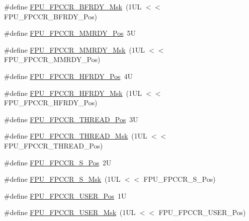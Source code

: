 \begin{DoxyCompactItemize}
\item 
\#define \mbox{\hyperlink{group___c_m_s_i_s___f_p_u_gad349eb1323d8399d54a04c0bfd520cb2}{F\+P\+U\+\_\+\+F\+P\+C\+C\+R\+\_\+\+B\+F\+R\+D\+Y\+\_\+\+Msk}}~(1\+U\+L $<$$<$ F\+P\+U\+\_\+\+F\+P\+C\+C\+R\+\_\+\+B\+F\+R\+D\+Y\+\_\+\+Pos)
\item 
\#define \mbox{\hyperlink{group___c_m_s_i_s___f_p_u_gaccdb481211629f9440431439231187f1}{F\+P\+U\+\_\+\+F\+P\+C\+C\+R\+\_\+\+M\+M\+R\+D\+Y\+\_\+\+Pos}}~5U
\item 
\#define \mbox{\hyperlink{group___c_m_s_i_s___f_p_u_gadedfaec9fdd07261573e823a4dcfb5c4}{F\+P\+U\+\_\+\+F\+P\+C\+C\+R\+\_\+\+M\+M\+R\+D\+Y\+\_\+\+Msk}}~(1\+U\+L $<$$<$ F\+P\+U\+\_\+\+F\+P\+C\+C\+R\+\_\+\+M\+M\+R\+D\+Y\+\_\+\+Pos)
\item 
\#define \mbox{\hyperlink{group___c_m_s_i_s___f_p_u_gab12733991487acc2da41ca300fe36fb6}{F\+P\+U\+\_\+\+F\+P\+C\+C\+R\+\_\+\+H\+F\+R\+D\+Y\+\_\+\+Pos}}~4U
\item 
\#define \mbox{\hyperlink{group___c_m_s_i_s___f_p_u_gaf4beaa279abff34828344bd594fff8a1}{F\+P\+U\+\_\+\+F\+P\+C\+C\+R\+\_\+\+H\+F\+R\+D\+Y\+\_\+\+Msk}}~(1\+U\+L $<$$<$ F\+P\+U\+\_\+\+F\+P\+C\+C\+R\+\_\+\+H\+F\+R\+D\+Y\+\_\+\+Pos)
\item 
\#define \mbox{\hyperlink{group___c_m_s_i_s___f_p_u_ga0937d64c42374200af44b22e5b49fd26}{F\+P\+U\+\_\+\+F\+P\+C\+C\+R\+\_\+\+T\+H\+R\+E\+A\+D\+\_\+\+Pos}}~3U
\item 
\#define \mbox{\hyperlink{group___c_m_s_i_s___f_p_u_ga8d18cd88336d63d4b1810383aa8da700}{F\+P\+U\+\_\+\+F\+P\+C\+C\+R\+\_\+\+T\+H\+R\+E\+A\+D\+\_\+\+Msk}}~(1\+U\+L $<$$<$ F\+P\+U\+\_\+\+F\+P\+C\+C\+R\+\_\+\+T\+H\+R\+E\+A\+D\+\_\+\+Pos)
\item 
\#define \mbox{\hyperlink{group___c_m_s_i_s___f_p_u_ga4123d3881e5342251f559cec19e23b4e}{F\+P\+U\+\_\+\+F\+P\+C\+C\+R\+\_\+\+S\+\_\+\+Pos}}~2U
\item 
\#define \mbox{\hyperlink{group___c_m_s_i_s___f_p_u_ga47d3d3b29514c7d7581cfcc304368cea}{F\+P\+U\+\_\+\+F\+P\+C\+C\+R\+\_\+\+S\+\_\+\+Msk}}~(1\+U\+L $<$$<$ F\+P\+U\+\_\+\+F\+P\+C\+C\+R\+\_\+\+S\+\_\+\+Pos)
\item 
\#define \mbox{\hyperlink{group___c_m_s_i_s___f_p_u_gaea663104375ce6be15470e3db294c92d}{F\+P\+U\+\_\+\+F\+P\+C\+C\+R\+\_\+\+U\+S\+E\+R\+\_\+\+Pos}}~1U
\item 
\#define \mbox{\hyperlink{group___c_m_s_i_s___f_p_u_ga2eb70427eeaa7344196219cf5a8620a4}{F\+P\+U\+\_\+\+F\+P\+C\+C\+R\+\_\+\+U\+S\+E\+R\+\_\+\+Msk}}~(1\+U\+L $<$$<$ F\+P\+U\+\_\+\+F\+P\+C\+C\+R\+\_\+\+U\+S\+E\+R\+\_\+\+Pos)

\end{DoxyCompactItemize}
